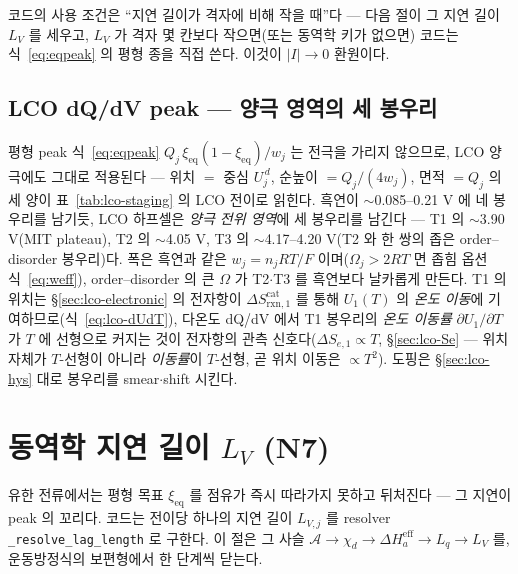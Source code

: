\documentclass[11pt,a4paper]{article}
\newcommand{\eff}{\mathrm{eff}}
\newcommand{\eq}{\mathrm{eq}}
\newcommand{\rxn}{\mathrm{rxn}}
\newcommand{\code}[1]{\texttt{#1}}
\begin{document}
코드의 사용 조건은 ``지연 길이가 격자에 비해 작을 때''다 — 다음 절이 그 지연 길이 $L_V$ 를 세우고, $L_V$ 가 격자
몇 칸보다 작으면(또는 동역학 키가 없으면) 코드는 식~\eqref{eq:eqpeak} 의 평형 종을 직접 쓴다. 이것이 $|I|\to0$ 환원이다.

\subsection{LCO dQ/dV peak — 양극 영역의 세 봉우리}\label{sec:lco-peak}
평형 peak 식~\eqref{eq:eqpeak} $Q_j\,\xi_\eq(1-\xi_\eq)/w_j$ 는 전극을 가리지 않으므로, LCO 양극에도 그대로 적용된다 —
위치 $=$ 중심 $U_j^{\,d}$, 순높이 $=Q_j/(4w_j)$, 면적 $=Q_j$ 의 세 양이 표~\ref{tab:lco-staging} 의 LCO 전이로 읽힌다.
흑연이 $\sim$0.085--0.21 V 에 네 봉우리를 남기듯, LCO 하프셀은 \emph{양극 전위 영역}에 세 봉우리를 남긴다 — T1 의
$\sim$3.90 V(MIT plateau), T2 의 $\sim$4.05 V, T3 의 $\sim$4.17--4.20 V(T2 와 한 쌍의 좁은 order--disorder 봉우리)다.
폭은 흑연과 같은 $w_j=n_jRT/F$ 이며($\Omega_j>2RT$ 면 좁힘 옵션 식~\eqref{eq:weff}), order--disorder 의 큰 $\Omega$
가 T2$\cdot$T3 를 흑연보다 날카롭게 만든다. T1 의 위치는 \S\ref{sec:lco-electronic} 의 전자항이
$\Delta S_{\rxn,1}^\mathrm{cat}$ 를 통해 $U_1(T)$ 의 \emph{온도 이동}에 기여하므로(식~\eqref{eq:lco-dUdT}), 다온도
dQ/dV 에서 T1 봉우리의 \emph{온도 이동률} $\partial U_1/\partial T$ 가 $T$ 에 선형으로 커지는 것이 전자항의 관측
신호다($\Delta S_{e,1}\propto T$, \S\ref{sec:lco-Se} — 위치 자체가 $T$-선형이 아니라 \emph{이동률}이 $T$-선형, 곧 위치
이동은 $\propto T^2$). 도핑은 \S\ref{sec:lco-hys} 대로 봉우리를 smear$\cdot$shift 시킨다.

\section{동역학 지연 길이 $L_V$ (N7)}\label{sec:lag}
유한 전류에서는 평형 목표 $\xi_\eq$ 를 점유가 즉시 따라가지 못하고 뒤처진다 — 그 지연이 peak 의 꼬리다. 코드는 전이당
하나의 지연 길이 $L_{V,j}$ 를 resolver \code{\_resolve\_lag\_length} 로 구한다. 이 절은 그 사슬
$\mathcal A\to\chi_d\to\Delta H_a^\eff\to L_q\to L_V$ 를, 운동방정식의 보편형에서 한 단계씩 닫는다.
\end{document}
